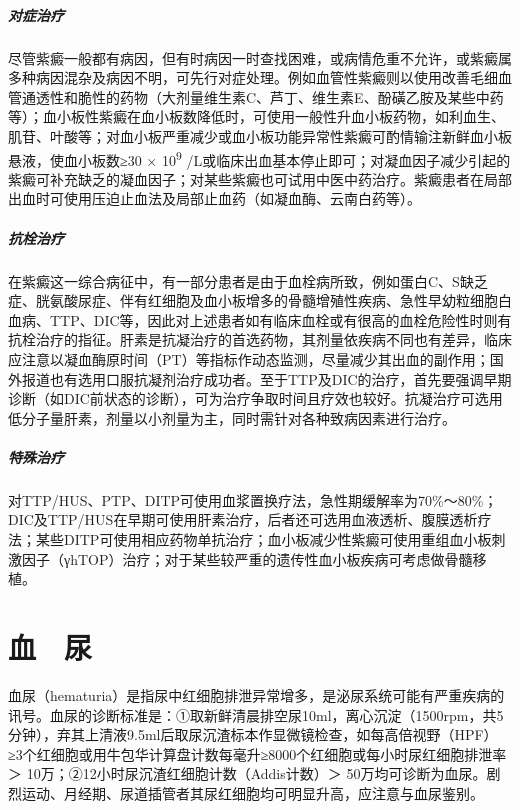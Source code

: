 \paragraph{对症治疗}

尽管紫癜一般都有病因，但有时病因一时查找困难，或病情危重不允许，或紫癜属多种病因混杂及病因不明，可先行对症处理。例如血管性紫癜则以使用改善毛细血管通透性和脆性的药物（大剂量维生素C、芦丁、维生素E、酚磺乙胺及某些中药等）；血小板性紫癜在血小板数降低时，可使用一般性升血小板药物，如利血生、肌苷、叶酸等；对血小板严重减少或血小板功能异常性紫癜可酌情输注新鲜血小板悬液，使血小板数≥30
× 10\textsuperscript{9}
/L或临床出血基本停止即可；对凝血因子减少引起的紫癜可补充缺乏的凝血因子；对某些紫癜也可试用中医中药治疗。紫癜患者在局部出血时可使用压迫止血法及局部止血药（如凝血酶、云南白药等）。

\paragraph{抗栓治疗}

在紫癜这一综合病征中，有一部分患者是由于血栓病所致，例如蛋白C、S缺乏症、胱氨酸尿症、伴有红细胞及血小板增多的骨髓增殖性疾病、急性早幼粒细胞白血病、TTP、DIC等，因此对上述患者如有临床血栓或有很高的血栓危险性时则有抗栓治疗的指征。肝素是抗凝治疗的首选药物，其剂量依疾病不同也有差异，临床应注意以凝血酶原时间（PT）等指标作动态监测，尽量减少其出血的副作用；国外报道也有选用口服抗凝剂治疗成功者。至于TTP及DIC的治疗，首先要强调早期诊断（如DIC前状态的诊断），可为治疗争取时间且疗效也较好。抗凝治疗可选用低分子量肝素，剂量以小剂量为主，同时需针对各种致病因素进行治疗。

\paragraph{特殊治疗}

对TTP/HUS、PTP、DITP可使用血浆置换疗法，急性期缓解率为70\%～80\%；DIC及TTP/HUS在早期可使用肝素治疗，后者还可选用血液透析、腹膜透析疗法；某些DITP可使用相应药物单抗治疗；血小板减少性紫癜可使用重组血小板刺激因子（γhTOP）治疗；对于某些较严重的遗传性血小板疾病可考虑做骨髓移植。

\protect\hypertarget{text00037.html}{}{}

\chapter{血　尿}

血尿（hematuria）是指尿中红细胞排泄异常增多，是泌尿系统可能有严重疾病的讯号。血尿的诊断标准是：①取新鲜清晨排空尿10ml，离心沉淀（1500rpm，共5分钟），弃其上清液9.5ml后取尿沉渣标本作显微镜检查，如每高倍视野（HPF）≥3个红细胞或用牛包华计算盘计数每毫升≥8000个红细胞或每小时尿红细胞排泄率＞
10万；②12小时尿沉渣红细胞计数（Addis计数）＞
50万均可诊断为血尿。剧烈运动、月经期、尿道插管者其尿红细胞均可明显升高，应注意与血尿鉴别。

